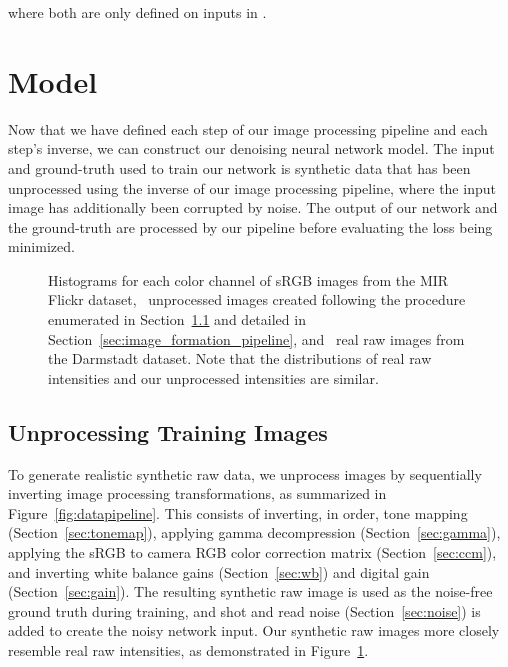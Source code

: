 \documentclass[10pt,twocolumn,letterpaper]{article}
\begin{document}
where both are only defined on inputs in .

\section{Model}
\label{sec:model}

Now that we have defined each step of our image processing pipeline and each step's inverse, we can construct our denoising neural network model. The input and ground-truth used to train our network is synthetic data that has been unprocessed using the inverse of our image processing pipeline, where the input image has additionally been corrupted by noise.
The output of our network and the ground-truth are processed by our pipeline before evaluating the loss being minimized.

\newcommand{\histwidth}{0.305\linewidth}
\begin{figure}[t]
\begin{center}
\end{center}
   \caption{
   Histograms for each color channel of  sRGB images from the MIR Flickr dataset, ~unprocessed images created following the procedure enumerated in Section~\ref{sec:preproc} and detailed in Section~\ref{sec:image_formation_pipeline}, and ~real raw images from the Darmstadt dataset. Note that the distributions of real raw intensities and our unprocessed intensities are similar.
}
   \label{fig:histograms}
\end{figure}

\subsection{Unprocessing Training Images}
\label{sec:preproc}

To generate realistic synthetic raw data, we unprocess images by sequentially inverting image processing transformations, as summarized in Figure~\ref{fig:datapipeline}. This consists of inverting, in order, tone mapping (Section~\ref{sec:tonemap}), applying gamma decompression (Section~\ref{sec:gamma}), applying the sRGB to camera RGB color correction matrix (Section~\ref{sec:ccm}), and inverting white balance gains (Section~\ref{sec:wb}) and digital gain (Section~\ref{sec:gain}). The resulting synthetic raw image is used as the noise-free ground truth during training, and shot and read noise (Section~\ref{sec:noise}) is added to create the noisy network input. Our synthetic raw images more closely resemble real raw intensities, as demonstrated in Figure~\ref{fig:histograms}.
\end{document}
